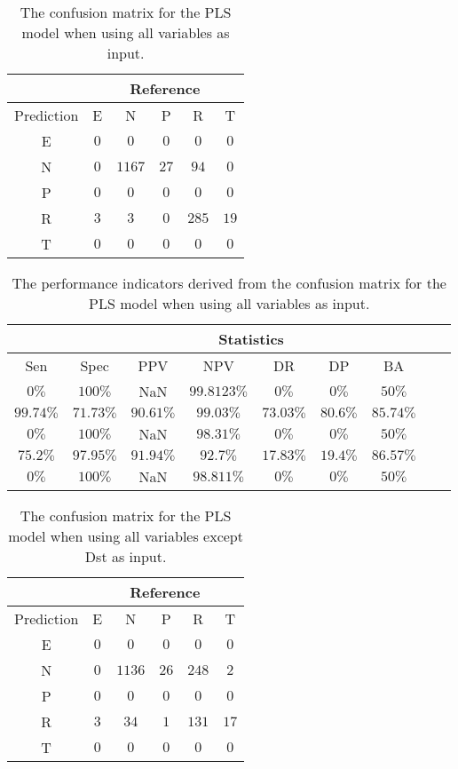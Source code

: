\begin{table}[!ht]
	\centering
	\begin{tabular}{|c|c|c|c|c|c|}
		\hline
		 & \multicolumn{5}{|c|}{Reference} \\ \hline
		 Prediction & E & N & P & R & T \\ \hline
		 E & $0$ & $0$ & $0$ & $0$ & $0$ \\ \hline
		 N & $0$ & $1167$ & $27$ & $94$ & $0$ \\ \hline
		 P & $0$ & $0$ & $0$ & $0$ & $0$ \\ \hline
		 R & $3$ & $3$ & $0$ & $285$ & $19$ \\ \hline
		 T & $0$ & $0$ & $0$ & $0$ & $0$ \\ \hline
	\end{tabular}
	\caption{The confusion matrix for the PLS model when using all variables as input.}
	\label{tab:cm:all:pls}
\end{table}

\begin{table}[!ht]
	\centering
	\begin{tabular}{|c|c|c|c|c|c|c|c|c|}
		\hline
		 & \multicolumn{7}{c|}{Statistics} \\ \hline
		Sen & Spec & PPV & NPV & DR & DP & BA \\ \hline
		$0\%$ & $100\%$ & NaN & $99.8123\%$ & $0\%$ & $0\%$ & $50\%$ \\ \hline
		$99.74\%$ & $71.73\%$ & $90.61\%$ & $99.03\%$ & $73.03\%$ & $80.6\%$ & $85.74\%$ \\ \hline
		$0\%$ & $100\%$ & NaN & $98.31\%$ & $0\%$ & $0\%$ & $50\%$ \\ \hline
		$75.2\%$ & $97.95\%$ & $91.94\%$ & $92.7\%$ & $17.83\%$ & $19.4\%$ & $86.57\%$ \\ \hline
		$0\%$ & $100\%$ & NaN & $98.811\%$ & $0\%$ & $0\%$ & $50\%$ \\ \hline
	\end{tabular}
	\caption{The performance indicators derived from the confusion matrix for the PLS model when using all variables as input.}
	\label{tab:cs:all:pls}
\end{table}

\begin{table}[!ht]
	\centering
	\begin{tabular}{|c|c|c|c|c|c|}
		\hline
		 & \multicolumn{5}{|c|}{Reference} \\ \hline
		 Prediction & E & N & P & R & T \\ \hline
		 E & $0$ & $0$ & $0$ & $0$ & $0$ \\ \hline
		 N & $0$ & $1136$ & $26$ & $248$ & $2$ \\ \hline
		 P & $0$ & $0$ & $0$ & $0$ & $0$ \\ \hline
		 R & $3$ & $34$ & $1$ & $131$ & $17$ \\ \hline
		 T & $0$ & $0$ & $0$ & $0$ & $0$ \\ \hline
	\end{tabular}
	\caption{The confusion matrix for the PLS model when using all variables except Dst as input.}
	\label{tab:cm:noDst:pls}
\end{table}

